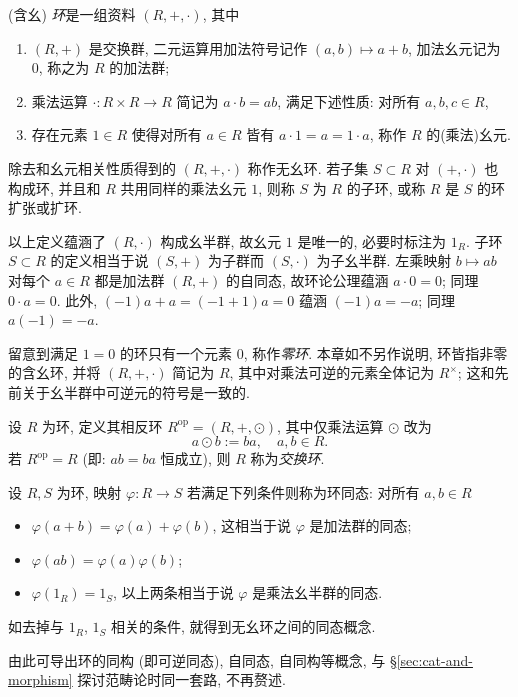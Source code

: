 \begin{definition}
	(含幺) \emph{环}是一组资料 $(R, +, \cdot)$, 其中
	\begin{enumerate}
		\item $(R, +)$ 是交换群, 二元运算用加法符号记作 $(a,b) \mapsto a+b$, 加法幺元记为 $0$, 称之为 $R$ 的加法群;
		\item 乘法运算 $\cdot: R \times R \to R$ 简记为 $a \cdot b = ab$, 满足下述性质: 对所有 $a, b, c \in R$,
		\item 存在元素 $1 \in R$ 使得对所有 $a \in R$ 皆有 $a \cdot 1 = a = 1 \cdot a$, 称作 $R$ 的(乘法)幺元.
	\end{enumerate}
	除去和幺元相关性质得到的 $(R, +, \cdot)$ 称作无幺环. 若子集 $S \subset R$ 对 $(+, \cdot)$ 也构成环, 并且和 $R$ 共用同样的乘法幺元 $1$, 则称 $S$ 为 $R$ 的子环, 或称 $R$ 是 $S$ 的环扩张或扩环.
\end{definition}

以上定义蕴涵了 $(R, \cdot)$ 构成幺半群, 故幺元 $1$ 是唯一的, 必要时标注为 $1_R$. 子环 $S \subset R$ 的定义相当于说 $(S, +)$ 为子群而 $(S, \cdot)$ 为子幺半群. 左乘映射 $b \mapsto ab$ 对每个 $a \in R$ 都是加法群 $(R, +)$ 的自同态, 故环论公理蕴涵 $a \cdot 0 = 0$; 同理 $0 \cdot a = 0$. 此外, $(-1)a + a = (-1 + 1) a = 0$ 蕴涵 $(-1)a = -a$; 同理 $a(-1) = -a$.

留意到满足 $1=0$ 的环只有一个元素 $0$, 称作\emph{零环}. 本章如不另作说明, 环皆指非零的含幺环, 并将 $(R, +, \cdot)$ 简记为 $R$, 其中对乘法可逆的元素全体记为 $R^\times$; 这和先前关于幺半群中可逆元的符号是一致的.

\begin{definition}
	设 $R$ 为环, 定义其相反环 $R^\text{op} = (R, +, \odot)$, 其中仅乘法运算 $\odot$ 改为
	\[ a \odot b := ba, \quad a, b \in R. \]
	若 $R^\text{op}=R$ (即: $ab=ba$ 恒成立), 则 $R$ 称为\emph{交换环}. 
\end{definition}

\begin{definition}
	设 $R, S$ 为环, 映射 $\varphi: R \to S$ 若满足下列条件则称为环同态: 对所有 $a, b \in R$
	\begin{itemize}
		\item $\varphi(a+b) = \varphi(a)+\varphi(b)$, 这相当于说 $\varphi$ 是加法群的同态;
		\item $\varphi(ab)=\varphi(a)\varphi(b)$;
		\item $\varphi(1_R) = 1_S$, 以上两条相当于说 $\varphi$ 是乘法幺半群的同态.
	\end{itemize}
	如去掉与 $1_R$, $1_S$ 相关的条件, 就得到无幺环之间的同态概念.
\end{definition}
由此可导出环的同构 (即可逆同态), 自同态, 自同构等概念, 与 \S\ref{sec:cat-and-morphism} 探讨范畴论时同一套路, 不再赘述.


